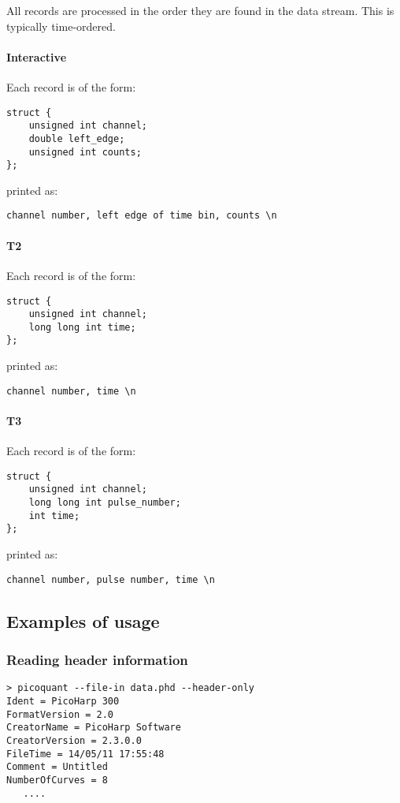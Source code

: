 \documentclass{article}
\begin{document}
All records are processed in the order they are found in the data stream. This is typically time-ordered.

\paragraph{Interactive}
Each record is of the form:
\begin{verbatim}
struct {
    unsigned int channel;
    double left_edge;
    unsigned int counts;
};
\end{verbatim}
printed as:
\begin{verbatim}
channel number, left edge of time bin, counts \n
\end{verbatim}

\paragraph{T2}
Each record is of the form:
\begin{verbatim}
struct {
	unsigned int channel;
	long long int time;
};
\end{verbatim}
printed as:
\begin{verbatim}
channel number, time \n
\end{verbatim}

\paragraph{T3}
Each record is of the form:
\begin{verbatim}
struct {
	unsigned int channel;
	long long int pulse_number;
	int time;
};
\end{verbatim}
printed as:
\begin{verbatim}
channel number, pulse number, time \n
\end{verbatim}
	
\subsection{Examples of usage}
\subsubsection{Reading header information}
\begin{verbatim}
> picoquant --file-in data.phd --header-only
Ident = PicoHarp 300
FormatVersion = 2.0
CreatorName = PicoHarp Software
CreatorVersion = 2.3.0.0
FileTime = 14/05/11 17:55:48
Comment = Untitled
NumberOfCurves = 8
   ....
\end{verbatim}
\end{document}
